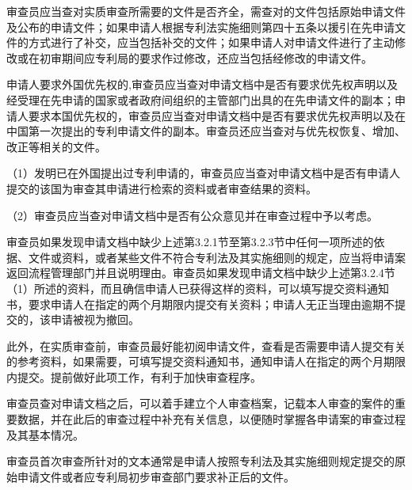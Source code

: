 审查员应当查对实质审查所需要的文件是否齐全，需查对的文件包括原始申请文件及公布的申请文件；如果申请人根据专利法实施细则第四十五条以援引在先申请文件的方式进行了补交，应当包括补交的文件；如果申请人对申请文件进行了主动修改或在初审期间应专利局的要求作过修改，还应当包括经修改的申请文件。

申请人要求外国优先权的,审查员应当查对申请文档中是否有要求优先权声明以及经受理在先申请的国家或者政府间组织的主管部门出具的在先申请文件的副本；申请人要求本国优先权的，审查员应当查对申请文档中是否有要求优先权声明以及在中国第一次提出的专利申请文件的副本。审查员还应当查对与优先权恢复、增加、改正等相关的文件。

{\setlength{\parindent}{17.1bp}（1）发明已在外国提出过专利申请的，审查员应当查对申请文档中是否有申请人提交的该国为审查其申请进行检索的资料或者审查结果的资料。\par}

{\setlength{\parindent}{17.1bp}（2）审查员应当查对申请文档中是否有公众意见并在审查过程中予以考虑。\par}

审查员如果发现申请文档中缺少上述第3.2.1节至第3.2.3节中任何一项所述的依据、文件或资料，或者某些文件不符合专利法及其实施细则的规定，应当将申请案返回流程管理部门并且说明理由。审查员如果发现申请文档中缺少上述第3.2.4节（1）所述的资料，而且确信申请人已获得这样的资料，可以填写提交资料通知书，要求申请人在指定的两个月期限内提交有关资料；申请人无正当理由逾期不提交的，该申请被视为撤回。

此外，在实质审查前，审查员最好能初阅申请文件，查看是否需要申请人提交有关的参考资料，如果需要，可填写提交资料通知书，通知申请人在指定的两个月期限内提交。提前做好此项工作，有利于加快审查程序。

审查员查对申请文档之后，可以着手建立个人审查档案，记载本人审查的案件的重要数据，并在此后的审查过程中补充有关信息，以便随时掌握各申请案的审查过程及其基本情况。

审查员首次审查所针对的文本通常是申请人按照专利法及其实施细则规定提交的原始申请文件或者应专利局初步审查部门要求补正后的文件。

